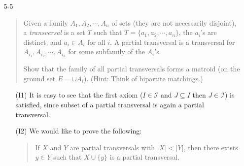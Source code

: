 \documentclass[12pt]{article}
\begin{document}




\begin{enumerate}


\item[5-5]

\begin{quote}
Given a family $A_1, A_2, \cdots, A_n$ of sets (they are not
necessarily disjoint), a {\it transversal} is a set $T$ such that
$T=\{a_1, a_2, \cdots, a_n\}$, the $a_i$'s are distinct, and $a_i\in
A_i$ for all $i$. A partial transversal is a transversal for $A_{i_1},
A_{i_2}, \cdots, A_{i_k}$ for some subfamily of the $A_i$'s.

Show that the family of all partial transversals forms a matroid (on
the ground set $E=\cup A_i$). (Hint: Think of bipartite matchings.)
\end{quote}

\begin{itemize}
\item[(I1)] It is easy to see that the first axiom ($I \in \mathcal{I}$ and $J \subseteq I$ then $J \in \mathcal{I}$) is satisfied, since subset of a partial transversal is again a partial transversal.

\item[(I2)]
We would like to prove the following:
\begin{quote}
If $X$ and $Y$ are partial transversals with $|X| < |Y|$, then there exists $y \in Y$ such that $X \cup \{y\}$ is a partial transversal.
\end{quote}


\end{itemize}
\end{enumerate}
\end{document}
